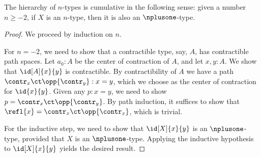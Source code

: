 %
\begin{thm}\label{thm:hlevel-cumulative}
 The hierarchy of $n$-types is cumulative in the following sense:
   given a number $n \geq -2$, if $X$ is an $n$-type, then it is also an $\nplusone$-type.
\end{thm}

\begin{proof}
 We proceed by induction on $n$.

 For $n = -2$, we need to show that a contractible type, say, $A$, has contractible path spaces.
       Let $a_0: A$ be the center of contraction of $A$, and let $x, y : A$. We show that $\id[A]{x}{y}$
       is contractible.
       By contractibility of $A$ we have a path $\contr_x \ct \opp{\contr_y} : x = y$, which we choose as
       the center of contraction for $\id{x}{y}$.
       Given any $p : x = y$, we need to show $p = \contr_x \ct \opp{\contr_y}$.
           By path induction, it suffices to show that
        $\refl{x} = \contr_x \ct \opp{\contr_x}$, which is trivial.

 For the inductive step, we need to show that $\id[X]{x}{y}$ is an $\nplusone$-type, provided
          that $X$ is an $\nplusone$-type. Applying the inductive hypothesis to $\id[X]{x}{y}$
         yields the desired result.
\end{proof}
